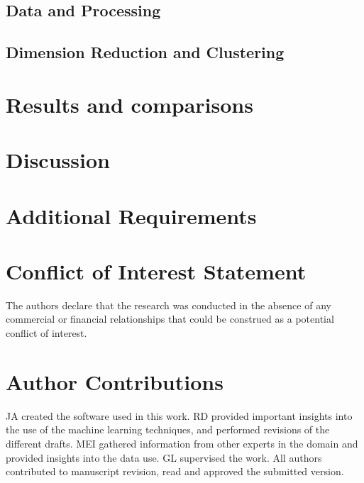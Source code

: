 \documentclass[utf8]{frontiersSCNS} %
\begin{document}
\subsection{Data and Processing}


\subsection{Dimension Reduction and Clustering}


\section{Results and comparisons}


\section{Discussion}


\section{Additional Requirements}

\section*{Conflict of Interest Statement}

The authors declare that the research was conducted in the absence of any commercial or financial relationships that could be construed as a potential conflict of interest.

\section*{Author Contributions}

JA created the software used in this work. RD provided important insights into the use of the machine learning techniques, and performed revisions of the different drafts. MEI gathered information from other experts in the domain and provided insights into the data use. GL supervised the work. All authors contributed to manuscript revision, read and approved the submitted version.
\end{document}

